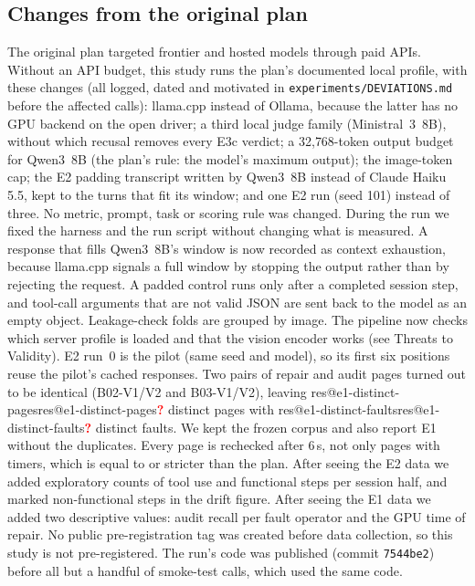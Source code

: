 \documentclass[conference]{IEEEtran}
\makeatletter
\newcommand{\res}[1]{\ifcsname res@#1\endcsname\csname res@#1\endcsname\else\pending{#1}\fi}
\newcommand{\pending}[1]{\textcolor{red}{\textbf{?}}}
\newcommand{\Q}{Qwen3~8B}
\newcommand{\MI}{Ministral~3~8B}
\makeatother
\begin{document}
\subsection{Changes from the original plan}
The original plan targeted frontier and hosted models through paid APIs. Without an API
budget, this study runs the plan's documented local profile, with these changes (all logged,
dated and motivated in \texttt{experiments/DEVIATIONS.md} before the affected calls):
llama.cpp instead of Ollama, because the latter has no GPU backend on the open driver;
a third local judge family (\MI), without which recusal removes every E3c verdict; a 32{,}768-token
output budget for \Q{} (the plan's rule: the model's maximum output); the image-token cap; the E2
padding transcript written by \Q{} instead of Claude Haiku 5.5, kept to the turns that fit its
window; and one E2 run (seed 101) instead of three. No metric, prompt, task or scoring rule
was changed. During the run we fixed the harness and the run script without changing what is
measured. A response that fills \Q's window is now recorded as context exhaustion, because
llama.cpp signals a full window by stopping the output rather than by rejecting the request. A
padded control runs only after a completed session step, and tool-call arguments that are not
valid JSON are sent back to the model as an empty object. Leakage-check folds are grouped by
image. The pipeline now checks which server profile is loaded and that the vision encoder works
(see Threats to Validity). E2 run~0 is the pilot (same seed and model), so its first six
positions reuse the pilot's cached responses. Two pairs of repair and audit pages turned out to
be identical (B02-V1/V2 and B03-V1/V2), leaving \res{e1-distinct-pages} distinct pages with
\res{e1-distinct-faults} distinct faults. We kept the frozen corpus and also report E1 without
the duplicates. Every page is rechecked after 6\,s, not only pages with timers, which is equal
to or stricter than the plan. After seeing the E2 data we added exploratory counts of tool use
and functional steps per session half, and marked non-functional steps in the drift figure.
After seeing the E1 data we added two descriptive values: audit recall per fault operator and the
GPU time of repair. No public pre-registration tag was created before data collection, so this study
is not pre-registered. The run's code was published (commit \texttt{7544be2}) before all but
a handful of smoke-test calls, which used the same code.

\end{document}

